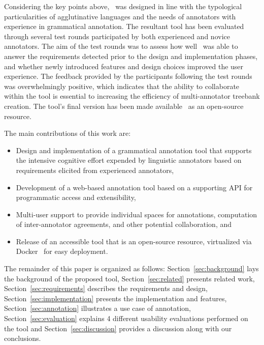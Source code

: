 Considering the key points above, \boatvtwo\ was designed in line with the typological particularities of agglutinative languages and the needs of annotators with experience in grammatical annotation.
The resultant tool has been evaluated through several test rounds participated by both experienced and novice annotators.
The aim of the test rounds was to assess how well \boatvtwo\ was able to answer the requirements detected prior to the design and implementation phases, and whether newly introduced features and design choices improved the user experience.
The feedback provided by the participants following the test rounds was overwhelmingly positive, which indicates that the ability to collaborate within the tool is essential to increasing the efficiency of multi-annotator treebank creation.
The tool's final version has been made available~\cite{anon} as an open-source resource.

The main contributions of this work are:
\begin{itemize}
\setlength\itemsep{0em}
        \item Design and implementation of a grammatical annotation tool that supports the intensive cognitive effort expended by linguistic annotators based on requirements elicited from experienced annotators,
        \item Development of a web-based annotation tool based on a supporting API for programmatic access and extensibility,
        \item Multi-user support to provide individual spaces for annotations, computation of inter-annotator agreements, and other potential collaboration, and
        \item Release of an accessible tool that is an open-source resource, virtualized via Docker~\cite{docker} for easy deployment.
\end{itemize}

The remainder of this paper is organized as follows:
Section~\ref{sec:background} lays the background of the proposed tool,
Section~\ref{sec:related} presents related work,
Section~\ref{sec:requirements} describes the requirements and design,
Section~\ref{sec:implementation} presents the implementation and features,
Section~\ref{sec:annotation} illustrates a use case of annotation,
Section~\ref{sec:evaluation} explains 4 different usability evaluations performed on the tool and
Section~\ref{sec:discussion} provides a discussion along with our conclusions.
